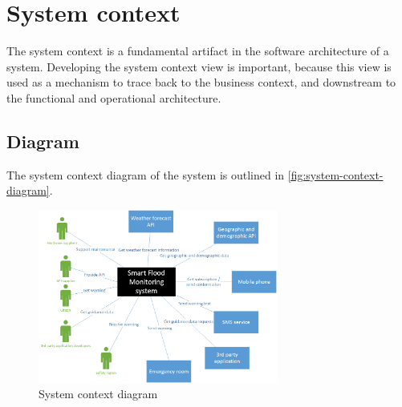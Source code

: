 \section{System context}
The system context is a fundamental artifact in the software architecture of a system. Developing the system context view is important, because this view is used as a mechanism to trace back to the business context, and downstream to the functional and operational architecture.

\subsection{Diagram}
The system context diagram of the system is outlined in \autoref{fig:system-context-diagram}.

\begin{figure}[H]
\centering
\includegraphics[keepaspectratio=true,width=0.7\textwidth]{images/system_context.png}
\caption{System context diagram}
\label{fig:system-context-diagram}
\end{figure}

